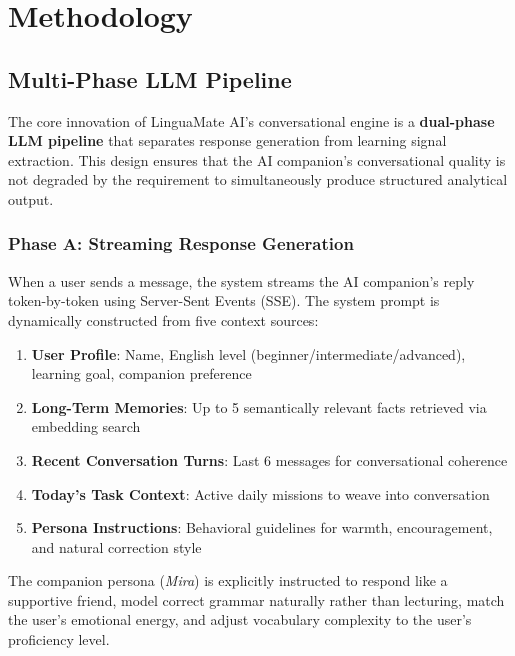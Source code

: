 \documentclass[conference]{IEEEtran}
\begin{document}
\section{Methodology}

\subsection{Multi-Phase LLM Pipeline}

The core innovation of LinguaMate AI's conversational engine is a \textbf{dual-phase LLM pipeline} that separates response generation from learning signal extraction. This design ensures that the AI companion's conversational quality is not degraded by the requirement to simultaneously produce structured analytical output.

\subsubsection{Phase A: Streaming Response Generation}

When a user sends a message, the system streams the AI companion's reply token-by-token using Server-Sent Events (SSE). The system prompt is dynamically constructed from five context sources:

\begin{enumerate}
    \item \textbf{User Profile}: Name, English level (beginner/intermediate/advanced), learning goal, companion preference
    \item \textbf{Long-Term Memories}: Up to 5 semantically relevant facts retrieved via embedding search
    \item \textbf{Recent Conversation Turns}: Last 6 messages for conversational coherence
    \item \textbf{Today's Task Context}: Active daily missions to weave into conversation
    \item \textbf{Persona Instructions}: Behavioral guidelines for warmth, encouragement, and natural correction style
\end{enumerate}

The companion persona (\textit{Mira}) is explicitly instructed to respond like a supportive friend, model correct grammar naturally rather than lecturing, match the user's emotional energy, and adjust vocabulary complexity to the user's proficiency level.
\end{document}
